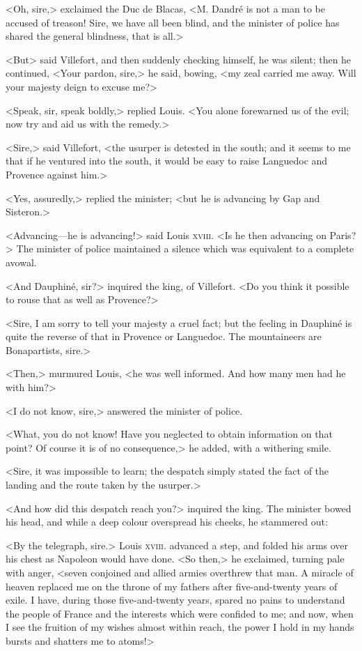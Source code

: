  <Oh, sire,> exclaimed the Duc de Blacas, <M. Dandré is not a man to be accused of treason! Sire, we have all been blind, and the minister of police has shared the general blindness, that is all.> 

 <But\longdash> said Villefort, and then suddenly checking himself, he was silent; then he continued, <Your pardon, sire,> he said, bowing, <my zeal carried me away. Will your majesty deign to excuse me?> 

 <Speak, sir, speak boldly,> replied Louis. <You alone forewarned us of the evil; now try and aid us with the remedy.> 

 <Sire,> said Villefort, <the usurper is detested in the south; and it seems to me that if he ventured into the south, it would be easy to raise Languedoc and Provence against him.> 

 <Yes, assuredly,> replied the minister; <but he is advancing by Gap and Sisteron.> 

 <Advancing—he is advancing!> said Louis \textsc{xviii.} <Is he then advancing on Paris?> The minister of police maintained a silence which was equivalent to a complete avowal. 

 <And Dauphiné, sir?> inquired the king, of Villefort. <Do you think it possible to rouse that as well as Provence?> 

 <Sire, I am sorry to tell your majesty a cruel fact; but the feeling in Dauphiné is quite the reverse of that in Provence or Languedoc. The mountaineers are Bonapartists, sire.> 

 <Then,> murmured Louis, <he was well informed. And how many men had he with him?> 

 <I do not know, sire,> answered the minister of police. 

 <What, you do not know! Have you neglected to obtain information on that point? Of course it is of no consequence,> he added, with a withering smile. 

 <Sire, it was impossible to learn; the despatch simply stated the fact of the landing and the route taken by the usurper.> 

 <And how did this despatch reach you?> inquired the king. The minister bowed his head, and while a deep colour overspread his cheeks, he stammered out: 

 <By the telegraph, sire.> Louis \textsc{xviii.} advanced a step, and folded his arms over his chest as Napoleon would have done.  <So then,> he exclaimed, turning pale with anger, <seven conjoined and allied armies overthrew that man. A miracle of heaven replaced me on the throne of my fathers after five-and-twenty years of exile. I have, during those five-and-twenty years, spared no pains to understand the people of France and the interests which were confided to me; and now, when I see the fruition of my wishes almost within reach, the power I hold in my hands bursts and shatters me to atoms!> 

